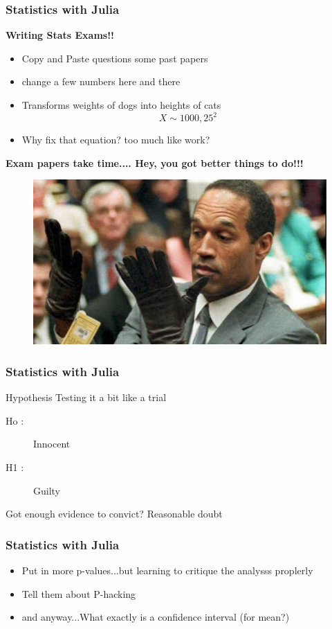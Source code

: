 \documentclass[Master.tex]{subfiles}
\begin{document}
\begin{frame}
	\frametitle{Statistics with Julia}
	\large
	\textbf{Writing Stats Exams!!}
	\begin{itemize}
		\item Copy and Paste questions some past papers 
		\item change a few numbers here and there
		\item Transforms weights of dogs into heights of cats
		\[ X  \sim {1000,25^2} \]
		\item Why fix that equation? too much like work?
		
	\end{itemize}	
	\textbf{Exam papers take time....	Hey, you got better things to do!!!}
	
\end{frame}	
\begin{frame}
	\begin{figure}
\centering
\includegraphics[width=0.98\linewidth]{images/OJ}
\end{figure}

\end{frame}
\begin{frame}
	\frametitle{Statistics with Julia}
	\large	
Hypothesis Testing it a bit like a trial

\begin{description}	
\item[Ho :] Innocent
\item[H1 :] Guilty
\end{description}	
	Got enough evidence to convict? Reasonable doubt
\end{frame}
\begin{frame}
	\frametitle{Statistics with Julia}
	\large	
	\begin{itemize}
		\item Put in more p-values...but learning to critique the analysss proplerly
		
		\item Tell them about P-hacking
		
		\item and anyway...What exactly is a confidence interval (for mean?)
	\end{itemize}

\end{frame}
\end{document}
